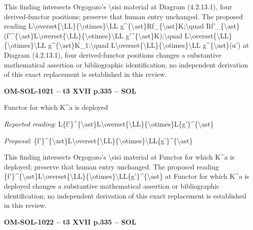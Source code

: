 This finding intersects Orgogozo's \textbackslash{}sisi material at Diagram (4.2.13.1), four derived-functor positions; preserve that human entry unchanged. The proposed reading L\textbackslash{}overset\{\textbackslash{}LL\}\{\textbackslash{}otimes\}\textbackslash{}LL g\textasciicircum{}\{\textbackslash{}ast\}Rf\_\{\textbackslash{}ast\}K;\textbackslash{}quad Rf'\_\{\textbackslash{}ast\}(f'\textasciicircum{}\{\textbackslash{}ast\}L\textbackslash{}overset\{\textbackslash{}LL\}\{\textbackslash{}otimes\}\textbackslash{}LL g'\textasciicircum{}\{\textbackslash{}ast\}K);\textbackslash{}quad L\textbackslash{}overset\{\textbackslash{}LL\}\{\textbackslash{}otimes\}\textbackslash{}LL g\textasciicircum{}\{\textbackslash{}ast\}K\_1;\textbackslash{}quad L\textbackslash{}overset\{\textbackslash{}LL\}\{\textbackslash{}otimes\}\textbackslash{}LL g\textasciicircum{}\{\textbackslash{}ast\}(u') at Diagram (4.2.13.1), four derived-functor positions changes a substantive mathematical assertion or bibliographic identification; no independent derivation of this exact replacement is established in this review.\par
\par\noindent\textbf{OM-SOL-1021 -- t3 XVII p.335 -- SOL}\par
Functor for which K\textasciicircum{}a is deployed\par
\emph{Reported reading}: L\{f'\}\textasciicircum{}\{\textbackslash{}ast\}L\textbackslash{}overset\{\textbackslash{}LL\}\{\textbackslash{}otimes\}L\{g'\}\textasciicircum{}\{\textbackslash{}ast\}\par
\emph{Proposal}: \{f'\}\textasciicircum{}\{\textbackslash{}ast\}L\textbackslash{}overset\{\textbackslash{}LL\}\{\textbackslash{}otimes\}\textbackslash{}LL\{g'\}\textasciicircum{}\{\textbackslash{}ast\}\par
This finding intersects Orgogozo's \textbackslash{}sisi material at Functor for which K\textasciicircum{}a is deployed; preserve that human entry unchanged. The proposed reading \{f'\}\textasciicircum{}\{\textbackslash{}ast\}L\textbackslash{}overset\{\textbackslash{}LL\}\{\textbackslash{}otimes\}\textbackslash{}LL\{g'\}\textasciicircum{}\{\textbackslash{}ast\} at Functor for which K\textasciicircum{}a is deployed changes a substantive mathematical assertion or bibliographic identification; no independent derivation of this exact replacement is established in this review.\par
\par\noindent\textbf{OM-SOL-1022 -- t3 XVII p.335 -- SOL}\par
